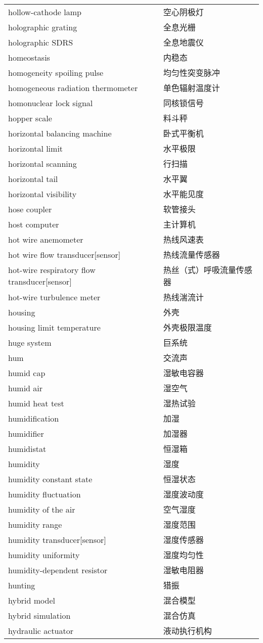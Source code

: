 \documentclass[
]{article}
\begin{document}
\begin{longtable}[]{@{}ll@{}}
hollow-cathode lamp & 空心阴极灯 \\
holographic grating & 全息光栅 \\
holographic SDRS & 全息地震仪 \\
homeostasis & 内稳态 \\
homogeneity spoiling pulse & 均匀性突变脉冲 \\
homogeneous radiation thermometer & 单色辐射温度计 \\
homonuclear lock signal & 同核锁信号 \\
hopper scale & 料斗秤 \\
horizontal balancing machine & 卧式平衡机 \\
horizontal limit & 水平极限 \\
horizontal scanning & 行扫描 \\
horizontal tail & 水平翼 \\
horizontal visibility & 水平能见度 \\
hose coupler & 软管接头 \\
host computer & 主计算机 \\
hot wire anemometer & 热线风速表 \\
hot wire flow transducer{[}sensor{]} & 热线流量传感器 \\
hot-wire respiratory flow transducer{[}sensor{]} &
热丝（式）呼吸流量传感器 \\
hot-wire turbulence meter & 热线湍流计 \\
housing & 外壳 \\
housing limit temperature & 外壳极限温度 \\
huge system & 巨系统 \\
hum & 交流声 \\
humid cap & 湿敏电容器 \\
humid air & 湿空气 \\
humid heat test & 湿热试验 \\
humidification & 加湿 \\
humidifier & 加湿器 \\
humidistat & 恒湿箱 \\
humidity & 湿度 \\
humidity constant state & 恒湿状态 \\
humidity fluctuation & 湿度波动度 \\
humidity of the air & 空气湿度 \\
humidity range & 湿度范围 \\
humidity transducer{[}sensor{]} & 湿度传感器 \\
humidity uniformity & 湿度均匀性 \\
humidity-dependent resistor & 湿敏电阻器 \\
hunting & 猎振 \\
hybrid model & 混合模型 \\
hybrid simulation & 混合仿真 \\
hydraulic actuator & 液动执行机构 \\
\bottomrule()
\end{longtable}
\end{document}
